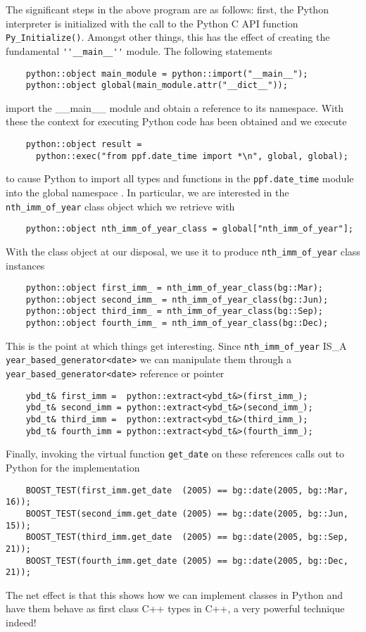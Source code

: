 The significant steps in the above program are as follows: first, the
Python interpreter is initialized with the call to the Python C API
function \verb|Py_Initialize()|. Amongst other things, this has the
effect of creating the fundamental \verb|''__main__''| module. The
following statements
\begin{verbatim}
    python::object main_module = python::import("__main__");
    python::object global(main_module.attr("__dict__"));
\end{verbatim}
import the \_\_main\_\_ module and obtain a reference to its
namespace. With these the context for executing Python code has been
obtained and we execute
\begin{verbatim}
    python::object result =
      python::exec("from ppf.date_time import *\n", global, global);
\end{verbatim}
to cause Python to import all types and functions in the
\verb|ppf.date_time| module into the global namespace . In particular,
we are interested in the \verb|nth_imm_of_year| class object which we
retrieve with
\begin{verbatim}
    python::object nth_imm_of_year_class = global["nth_imm_of_year"];
\end{verbatim} With the class object at our disposal, we use it to
produce \verb|nth_imm_of_year| class instances
\begin{verbatim}
    python::object first_imm_ = nth_imm_of_year_class(bg::Mar);
    python::object second_imm_ = nth_imm_of_year_class(bg::Jun);
    python::object third_imm_ = nth_imm_of_year_class(bg::Sep);
    python::object fourth_imm_ = nth_imm_of_year_class(bg::Dec);
\end{verbatim} This is the point at which things get
interesting. Since \verb|nth_imm_of_year| IS\_A
\verb|year_based_generator<date>| we can manipulate them through a
\verb|year_based_generator<date>| reference or pointer
\begin{verbatim}
    ybd_t& first_imm =  python::extract<ybd_t&>(first_imm_);
    ybd_t& second_imm = python::extract<ybd_t&>(second_imm_);
    ybd_t& third_imm =  python::extract<ybd_t&>(third_imm_);
    ybd_t& fourth_imm = python::extract<ybd_t&>(fourth_imm_);
\end{verbatim} Finally, invoking the virtual function \verb|get_date|
on these references calls out to Python for the implementation
\begin{verbatim}
    BOOST_TEST(first_imm.get_date  (2005) == bg::date(2005, bg::Mar, 16));
    BOOST_TEST(second_imm.get_date (2005) == bg::date(2005, bg::Jun, 15));
    BOOST_TEST(third_imm.get_date  (2005) == bg::date(2005, bg::Sep, 21));
    BOOST_TEST(fourth_imm.get_date (2005) == bg::date(2005, bg::Dec, 21));
\end{verbatim} The net effect is that this shows how we can implement
classes in Python and have them behave as first class C++ types in
C++, a very powerful technique indeed!

